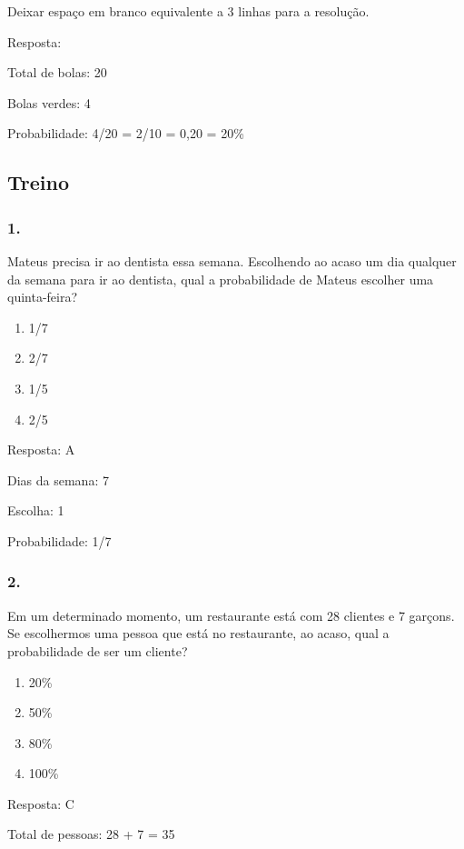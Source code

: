 Deixar espaço em branco equivalente a 3 linhas para a resolução.

Resposta:

Total de bolas: 20

Bolas verdes: 4

Probabilidade: 4/20 = 2/10 = 0,20 = 20\%

\subsection{Treino}\label{treino-6}

\subsubsection{1.}\label{section-88}

Mateus precisa ir ao dentista essa semana. Escolhendo ao acaso um dia
qualquer da semana para ir ao dentista, qual a probabilidade de Mateus
escolher uma quinta-feira?

\begin{enumerate}
\def\labelenumi{\alph{enumi})}
\item
  1/7
\item
  2/7
\item
  1/5
\item
  2/5
\end{enumerate}

Resposta: A

Dias da semana: 7

Escolha: 1

Probabilidade: 1/7

\subsubsection{2.}\label{section-89}

Em um determinado momento, um restaurante está com 28 clientes e 7
garçons. Se escolhermos uma pessoa que está no restaurante, ao acaso,
qual a probabilidade de ser um cliente?

\begin{enumerate}
\def\labelenumi{\alph{enumi})}
\item
  20\%
\item
  50\%
\item
  80\%
\item
  100\%
\end{enumerate}

Resposta: C

Total de pessoas: 28 + 7 = 35

